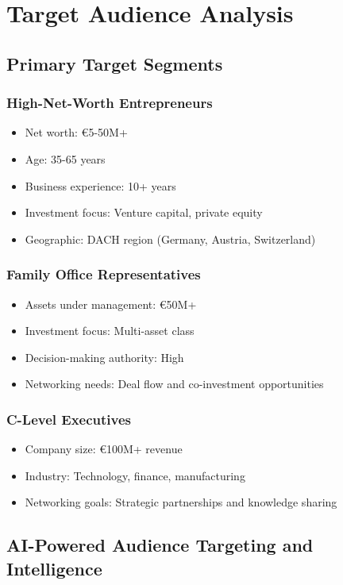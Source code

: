 \chapter{Target Audience Analysis}

\section{Primary Target Segments}

\subsection{High-Net-Worth Entrepreneurs}
\begin{itemize}
    \item Net worth: €5-50M+
    \item Age: 35-65 years
    \item Business experience: 10+ years
    \item Investment focus: Venture capital, private equity
    \item Geographic: DACH region (Germany, Austria, Switzerland)
\end{itemize}

\subsection{Family Office Representatives}
\begin{itemize}
    \item Assets under management: €50M+
    \item Investment focus: Multi-asset class
    \item Decision-making authority: High
    \item Networking needs: Deal flow and co-investment opportunities
\end{itemize}

\subsection{C-Level Executives}
\begin{itemize}
    \item Company size: €100M+ revenue
    \item Industry: Technology, finance, manufacturing
    \item Networking goals: Strategic partnerships and knowledge sharing
\end{itemize}

\section{AI-Powered Audience Targeting and Intelligence}

